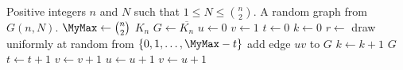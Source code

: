 
\begin{algorithmic}[1]
\Require Positive integers $n$ and $N$ such that $1 \leq N \leq \binom{n}{2}$.
\Ensure A random graph from $G(n,N)$.
\State $\MyMax \gets \binom{n}{2}$
  \State \Return $K_n$
\EndIf
\State $G \gets \overline{K_n}$
\State $u \gets 0$
\State $v \gets 1$
\State $t \gets 0$
\State $k \gets 0$
\While{$\MyTrue$}
  \State $r \gets$ draw uniformly at random from $\{0, 1, \dots, \MyMax - t\}$
    \State add edge $uv$ to $G$
    \State $k \gets k + 1$
      \State \Return $G$
    \EndIf
  \EndIf
  \State $t \gets t + 1$
  \State $v \gets v + 1$
    \State $u \gets u + 1$
    \State $v \gets u + 1$
  \EndIf
\EndWhile
\end{algorithmic}
